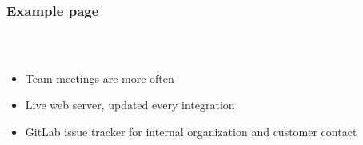 \begin{frame}
  \frametitle{Example page}
  \begin{columns}
  	\begin{column}{0.8\textwidth}
   	  \begin{description}[]
        \item[Workflow] \hfill \\
        \begin{itemize}
          \item Team meetings are more often
          \item Live web server, updated every integration
          \item GitLab issue tracker for internal organization and customer contact
        \end{itemize}
  

\end{description}
\end{column}
\end{columns}
\end{frame}
